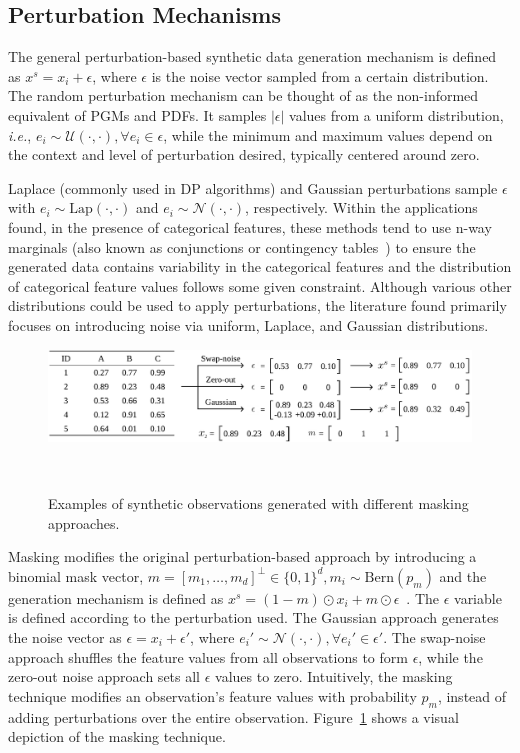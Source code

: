 \subsection{Perturbation Mechanisms}

The general perturbation-based synthetic data generation mechanism is defined
as $x^s = x_i + \epsilon$, where $\epsilon$ is the noise vector sampled from a
certain distribution. The random perturbation mechanism can be thought of as
the non-informed equivalent of PGMs and PDFs. It samples $|\epsilon|$ values
from a uniform distribution, \textit{i.e.}, $e_i \sim \mathcal{U}(\cdot,
\cdot), \forall e_i \in \epsilon$, while the minimum and maximum values depend
on the context and level of perturbation desired, typically centered around
zero.

Laplace (commonly used in DP algorithms) and Gaussian perturbations sample
$\epsilon$ with $e_i \sim \text{Lap}(\cdot, \cdot)$ and $e_i \sim
\mathcal{N}(\cdot, \cdot)$, respectively. Within the applications found, in
the presence of categorical features, these methods tend to use n-way
marginals (also known as conjunctions or contingency
tables~\cite{gaboardi2014dual}) to ensure the generated data contains
variability in the categorical features and the distribution of categorical
feature values follows some given constraint. Although various other
distributions could be used to apply perturbations, the literature found
primarily focuses on introducing noise via uniform, Laplace, and Gaussian
distributions.

\begin{figure}
	\centering
	\includegraphics[width=.95\linewidth]{figures/synthetic-data-review/masking-example}
    \caption{Examples of synthetic observations generated with different
        masking approaches.
    }~\label{fig:masking-example}
\end{figure}

Masking modifies the original perturbation-based approach by introducing a
binomial mask vector, $m = [m_1, \ldots, m_d]^\bot \in \{0,1\}^d, m_i \sim
\text{Bern}(p_m)$ and the generation mechanism is defined as $x^s = (1 -
m)\odot x_i + m \odot \epsilon$~\cite{yoon2020vime}. The $\epsilon$ variable
is defined according to the perturbation used. The Gaussian approach generates
the noise vector as $\epsilon = x_i + \epsilon'$, where $e_i' \sim
\mathcal{N}(\cdot, \cdot), \forall e_i' \in \epsilon'$. The swap-noise
approach shuffles the feature values from all observations to form
$\epsilon$, while the zero-out noise approach sets all $\epsilon$ values to
zero. Intuitively, the masking technique modifies an observation's feature
values with probability $p_m$, instead of adding perturbations over the
entire observation. Figure~\ref{fig:masking-example} shows a visual depiction
of the masking technique.

